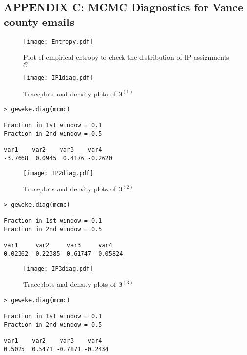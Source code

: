 \documentclass[a4paper]{article}
\begin{document}
 \subsection*{APPENDIX C: MCMC Diagnostics for Vance county emails}
 \begin{figure}[ht]
 	\centering
 	\texttt{[image: Entropy.pdf]} 
 	\caption{Plot of empirical entropy to check the distribution of IP assignments $\mathcal{C}$ }
 	\label{fig:IP1}
 \end{figure}
  \begin{figure}[ht]
 	\centering
 	\texttt{[image: IP1diag.pdf]} 
 		\caption{Traceplots and density plots of $\boldsymbol{\beta}^{(1)}$}
 	\label{fig:IP1}
 	 \end{figure}
\footnotesize
\begin{verbatim}
> geweke.diag(mcmc)

Fraction in 1st window = 0.1
Fraction in 2nd window = 0.5 

var1    var2    var3    var4 
-3.7668  0.0945  0.4176 -0.2620 
\end{verbatim} 	
\begin{figure}[ht]
	\centering
	\texttt{[image: IP2diag.pdf]} 
	\caption{Traceplots and density plots of $\boldsymbol{\beta}^{(2)}$}
	\label{fig:IP2}
\end{figure}
\footnotesize
\begin{verbatim}
> geweke.diag(mcmc)

Fraction in 1st window = 0.1
Fraction in 2nd window = 0.5 

var1     var2     var3     var4 
0.02362 -0.22385  0.61747 -0.05824 
\end{verbatim} 	 \clearpage
\begin{figure}[ht]
	\centering
	\texttt{[image: IP3diag.pdf]} 
	\caption{Traceplots and density plots of $\boldsymbol{\beta}^{(3)}$}
	\label{fig:IP3}
\end{figure}
\footnotesize
\begin{verbatim}
> geweke.diag(mcmc)

Fraction in 1st window = 0.1
Fraction in 2nd window = 0.5 

var1    var2    var3    var4 
0.5025  0.5471 -0.7871 -0.2434 
\end{verbatim} 	 



\end{document}
